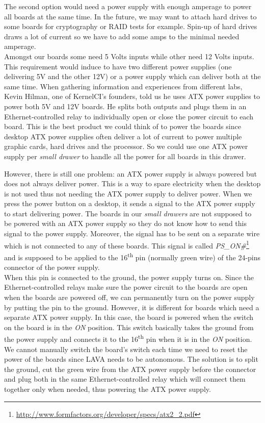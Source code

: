 The second option would need a power supply with enough amperage to power all boards at the same time. In the future, we may want to attach hard drives to some boards for cryptography or RAID tests for example. Spin-up of hard drives draws a lot of current so we have to add some amps to the minimal needed amperage.\\
Amongst our boards some need 5 Volts inputs while other need 12 Volts inputs. This requirement would induce to have two different power supplies (one delivering 5V and the other 12V) or a power supply which can deliver both at the same time. When gathering information and experiences from different labs, Kevin Hilman, one of KernelCI's founders, told us he uses ATX power supplies to power both 5V and 12V boards. He splits both outputs and plugs them in an Ethernet-controlled relay to individually open or close the power circuit to each board. This is the best product we could think of to power the boards since desktop ATX power supplies often deliver a lot of current to power multiple graphic cards, hard drives and the processor. So we could use one ATX power supply per \textit{small drawer} to handle all the power for all boards in this drawer.

However, there is still one problem: an ATX power supply is always powered but does not always deliver power. This is a way to spare electricity when the desktop is not used thus not needing the ATX power supply to deliver power. When we press the power button on a desktop, it sends a signal to the ATX power supply to start delivering power. The boards in our \textit{small drawers} are not supposed to be powered with an ATX power supply so they do not know how to send this signal to the power supply. Moreover, the signal has to be sent on a separate wire which is not connected to any of these boards. This signal is called \textit{PS\_ON\#}\footnote{\url{http://www.formfactors.org/developer/specs/atx2\_2.pdf}} and is supposed to be applied to the 16\textsuperscript{th} pin (normally green wire) of the 24-pins connector of the power supply.\\
When this pin is connected to the ground, the power supply turns on. Since the Ethernet-controlled relays make sure the power circuit to the boards are open when the boards are powered off, we can permanently turn on the power supply by putting the pin to the ground. However, it is different for boards which need a separate ATX power supply. In this case, the board is powered when the switch on the board is in the \textit{ON} position. This switch basically takes the ground from the power supply and connects it to the 16\textsuperscript{th} pin when it is in the \textit{ON} position. We cannot manually switch the board's switch each time we need to reset the power of the boards since LAVA needs to be autonomous. The solution is to split the ground, cut the green wire from the ATX power supply before the connector and plug both in the same Ethernet-controlled relay which will connect them together only when needed, thus powering the ATX power supply.

